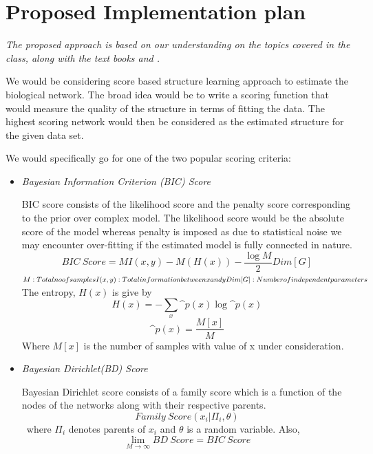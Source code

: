 \documentclass[conference]{IEEEtran}
\begin{document}
\section*{Proposed Implementation plan}
\textit{The proposed approach is based on our understanding on the topics covered in the class, along with the text books \cite{koller2009probabilistic} and \cite{barber2012bayesian}.}
\par
We would be considering score based structure learning approach to estimate the biological network. The broad idea would be to write a scoring function that would measure the quality of the structure in terms of fitting the data. The highest scoring network would then be considered as the estimated structure for the given data set.\par
We would specifically go for one of the two popular scoring criteria:\par
\begin{itemize}
    \item \textit{Bayesian Information Criterion (BIC) Score}
    \par
    BIC score consists of the likelihood score and the penalty score corresponding to the prior over complex model. The likelihood score would be the absolute score of the model whereas penalty is imposed as due to statistical noise we may encounter over-fitting if the estimated model is fully connected in nature. 
    \[BIC\ Score = MI(x, y) - M(H(x)) - \frac{\log M}{2}Dim[G]\]
    \(M: Total no of samples\\
    I(x, y): Total information between x and y\\
    Dim[G]: Number of independent parameters
    \)
    \\
    The entropy, \(H(x)\) is give by
    \[H(x) = -\sum_{x} \^{p}(x)\log{\^{p}(x)} \]
    \[\^{p}(x) = \frac{M[x]}{M}\]
    Where \(M[x]\) is the number of samples with value of x under consideration.
    \item \textit{Bayesian Dirichlet(BD) Score}
    \par 
    Bayesian Dirichlet score consists of a family score which is a function of the nodes of the networks along with their respective parents.
    \[Family\ Score(x_{i}|\Pi_{i}, \theta)\]\
    where \(\Pi_{i}\) denotes parents of \(x_{i}\) and \(\theta\) is a random variable.
    Also, 
    \[\lim_{M\to\infty} BD\ Score = BIC\ Score \]
\end{itemize}
\end{document}
